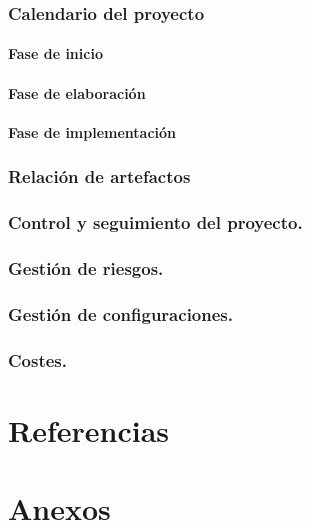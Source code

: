 \documentclass[11pt,a4paper,twoside]{report}
\begin{document}
\subsection{Calendario del proyecto}
\subsubsection{Fase de inicio}
\subsubsection{Fase de elaboración}
\subsubsection{Fase de implementación}
\subsection{Relación de artefactos}
\subsection{Control y seguimiento del proyecto.}
\subsection{Gestión de riesgos.}
\subsection{Gestión de configuraciones.}
\subsection{Costes.}

\chapter{Referencias}
\chapter{Anexos}
\end{document}
